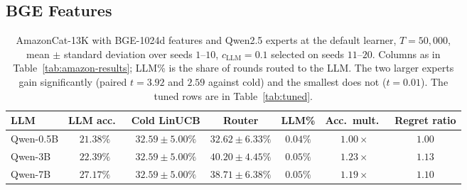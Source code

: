 \documentclass[anon]{alt2027} %
\begin{document}
\subsection{BGE Features}
\label{app:bge}

\begin{table}[ht]
\centering
\caption{AmazonCat-13K with BGE-1024d features and Qwen2.5 experts at the
default learner, $T=50{,}000$, mean $\pm$ standard deviation over seeds
$1$--$10$, $c_{\mathrm{LLM}}=0.1$ selected on seeds $11$--$20$. Columns as in
Table~\ref{tab:amazon-results}; LLM\% is the share of rounds routed to the
LLM. The two larger experts gain significantly (paired $t=3.92$ and $2.59$
against cold) and the smallest does not ($t=0.01$). The tuned rows are in
Table~\ref{tab:tuned}.}
\label{tab:bge-main}
\small
\setlength{\tabcolsep}{3pt}
\begin{tabular}{@{}lcccccc@{}}
\toprule
LLM & LLM acc.\ & Cold LinUCB & Router & LLM\% & Acc.\ mult.\ & Regret ratio \\
\midrule
Qwen-0.5B  & $21.38\%$ & $32.59\pm5.00\%$ & $32.62\pm6.33\%$ & $0.04\%$  & $1.00\times$ & $1.00$ \\
Qwen-3B  & $22.39\%$ & $32.59\pm5.00\%$ & $\mathbf{40.20\pm4.45\%}$ & $0.05\%$  & $\mathbf{1.23\times}$ & $\mathbf{1.13}$ \\
Qwen-7B  & $27.17\%$ & $32.59\pm5.00\%$ & $38.71\pm6.38\%$ & $0.05\%$  & $1.19\times$ & $1.10$ \\
\bottomrule
\end{tabular}
\end{table}
\end{document}
